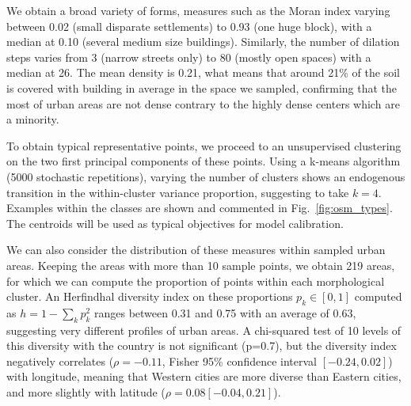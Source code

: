 \documentclass[letterpaper]{article}
\begin{document}
We obtain a broad variety of forms, measures such as the Moran index varying between 0.02 (small disparate settlements) to 0.93 (one huge block), with a median at 0.10 (several medium size buildings). Similarly, the number of dilation steps varies from 3 (narrow streets only) to 80 (mostly open spaces) with a median at 26. The mean density is 0.21, what means that around 21\% of the soil is covered with building in average in the space we sampled, confirming that the most of urban areas are not dense contrary to the highly dense centers which are a minority.


To obtain typical representative points, we proceed to an unsupervised clustering on the two first principal components of these points. Using a k-means algorithm (5000 stochastic repetitions), varying the number of clusters shows an endogenous transition in the within-cluster variance proportion, suggesting to take $k=4$. Examples within the classes are shown and commented in Fig.~\ref{fig:osm_types}. The centroids will be used as typical objectives for model calibration.


We can also consider the distribution of these measures within sampled urban areas. Keeping the areas with more than 10 sample points, we obtain 219 areas, for which we can compute the proportion of points within each morphological cluster. An Herfindhal diversity index on these proportions $p_k \in \left[0,1\right]$ computed as $h = 1 - \sum_k p_k^2$ ranges between 0.31 and 0.75 with an average of 0.63, suggesting very different profiles of urban areas. A chi-squared test of 10 levels of this diversity with the country is not significant (p=0.7), but the diversity index negatively correlates ($\rho = -0.11$, Fisher 95\% confidence interval $\left[-0.24,0.02\right]$) with longitude, meaning that Western cities are more diverse than Eastern cities, and more slightly with latitude ($\rho = 0.08 \left[-0.04,0.21\right]$).
\end{document}
